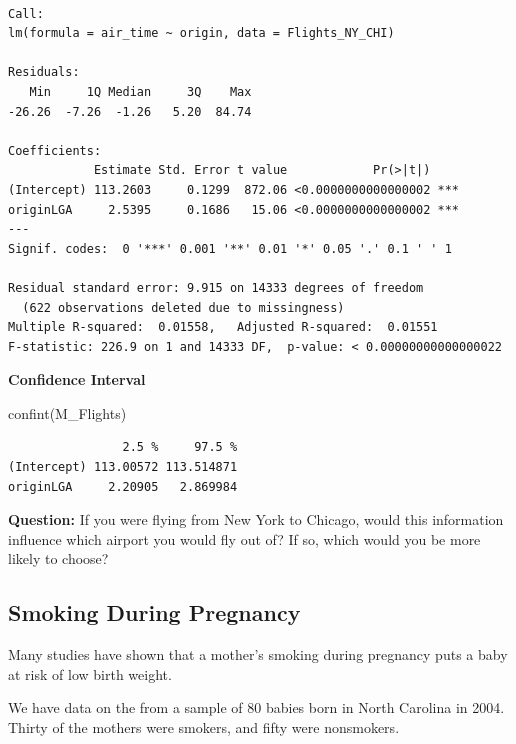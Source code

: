 \documentclass[
  letterpaper,
  DIV=11,
  numbers=noendperiod]{scrreprt}
\newenvironment{Shaded}{\begin{snugshade}}{\end{snugshade}}
\newcommand{\FunctionTok}[1]{\textcolor[rgb]{0.28,0.35,0.67}{#1}}
\newcommand{\NormalTok}[1]{\textcolor[rgb]{0.00,0.23,0.31}{#1}}
\begin{document}
\begin{verbatim}

Call:
lm(formula = air_time ~ origin, data = Flights_NY_CHI)

Residuals:
   Min     1Q Median     3Q    Max 
-26.26  -7.26  -1.26   5.20  84.74 

Coefficients:
            Estimate Std. Error t value            Pr(>|t|)    
(Intercept) 113.2603     0.1299  872.06 <0.0000000000000002 ***
originLGA     2.5395     0.1686   15.06 <0.0000000000000002 ***
---
Signif. codes:  0 '***' 0.001 '**' 0.01 '*' 0.05 '.' 0.1 ' ' 1

Residual standard error: 9.915 on 14333 degrees of freedom
  (622 observations deleted due to missingness)
Multiple R-squared:  0.01558,   Adjusted R-squared:  0.01551 
F-statistic: 226.9 on 1 and 14333 DF,  p-value: < 0.00000000000000022
\end{verbatim}

\textbf{Confidence Interval}

\begin{Shaded}
\begin{Highlighting}[]
\FunctionTok{confint}\NormalTok{(M\_Flights)}
\end{Highlighting}
\end{Shaded}

\begin{verbatim}
                2.5 %     97.5 %
(Intercept) 113.00572 113.514871
originLGA     2.20905   2.869984
\end{verbatim}

\textbf{Question:} If you were flying from New York to Chicago, would
this information influence which airport you would fly out of? If so,
which would you be more likely to choose?

\subsection{Smoking During Pregnancy}\label{smoking-during-pregnancy}

Many studies have shown that a mother's smoking during pregnancy puts a
baby at risk of low birth weight.

We have data on the from a sample of 80 babies born in North Carolina in
2004. Thirty of the mothers were smokers, and fifty were nonsmokers.
\end{document}
